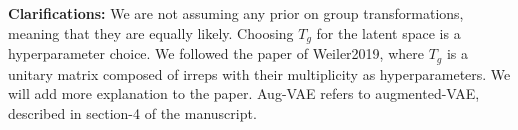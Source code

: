 \documentclass{article}
\begin{document}

\textbf{Clarifications:} We are not assuming any prior on group transformations, meaning that they are equally likely. Choosing $T_g$ for the latent space is a hyperparameter choice. We followed the paper of Weiler2019, where $T_g$ is a unitary matrix composed of irreps with their multiplicity as hyperparameters. We will add more explanation to the paper. Aug-VAE refers to augmented-VAE, described in section-4 of the manuscript.

\begin{small}










\end{small}
\end{document}
